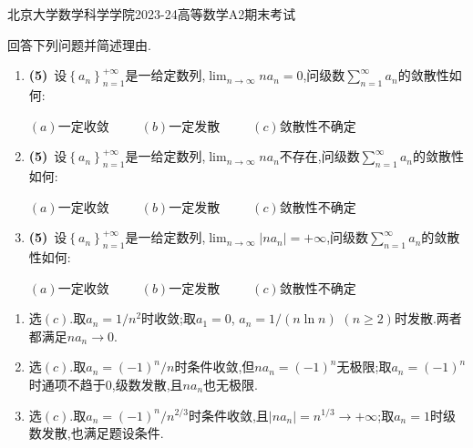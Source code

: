 \documentclass{ctexart}
\begin{document}
\pagestyle{empty}
\begin{center}\Large
    北京大学数学科学学院2023-24高等数学A2期末考试
\end{center}
\begin{problem}[1.(15\songti{分})]
回答下列问题并简述理由.
        \begin{enumerate}[label=\tbf{(\arabic*)},topsep=0pt,parsep=0pt,itemsep=0pt,partopsep=0pt]
            \item \textbf{(5)}\ 设$\left\{a_n\right\}_{n=1}^{+\infty}$是一给定数列,$\displaystyle\lim_{n\to\infty}na_n=0$,问级数$\displaystyle\sum_{n=1}^{\infty}a_n$的敛散性如何:
                \begin{center}
                    $(a)$一定收敛\ \ \ \ \ $(b)$一定发散\ \ \ \ \ $(c)$敛散性不确定
                \end{center}
            \item \textbf{(5)}\ 设$\left\{a_n\right\}_{n=1}^{+\infty}$是一给定数列,$\displaystyle\lim_{n\to\infty}na_n$不存在,问级数$\displaystyle\sum_{n=1}^{\infty}a_n$的敛散性如何:
                \begin{center}
                    $(a)$一定收敛\ \ \ \ \ $(b)$一定发散\ \ \ \ \ $(c)$敛散性不确定
                \end{center}
            \item \textbf{(5)}\ 设$\left\{a_n\right\}_{n=1}^{+\infty}$是一给定数列,$\displaystyle\lim_{n\to\infty}\left|na_n\right|=+\infty$,问级数$\displaystyle\sum_{n=1}^{\infty}a_n$的敛散性如何:
                \begin{center}
                    $(a)$一定收敛\ \ \ \ \ $(b)$一定发散\ \ \ \ \ $(c)$敛散性不确定
                \end{center}
        \end{enumerate}
\end{problem}
\begin{solution}
\begin{enumerate}[label=\tbf{(\arabic*)},topsep=0pt,parsep=0pt,itemsep=0pt,partopsep=0pt]
\item 选$(c)$.取$a_n=1/n^2$时收敛;取$a_1=0$, $a_n=1/(n\ln n)$ $(n\geqslant2)$时发散.两者都满足$na_n\to0$.
\item 选$(c)$.取$a_n=(-1)^n/n$时条件收敛,但$na_n=(-1)^n$无极限;取$a_n=(-1)^n$时通项不趋于$0$,级数发散,且$na_n$也无极限.
\item 选$(c)$.取$a_n=(-1)^n/n^{2/3}$时条件收敛,且$|na_n|=n^{1/3}\to+\infty$;取$a_n=1$时级数发散,也满足题设条件.
\end{enumerate}
\end{solution}
\end{document}
